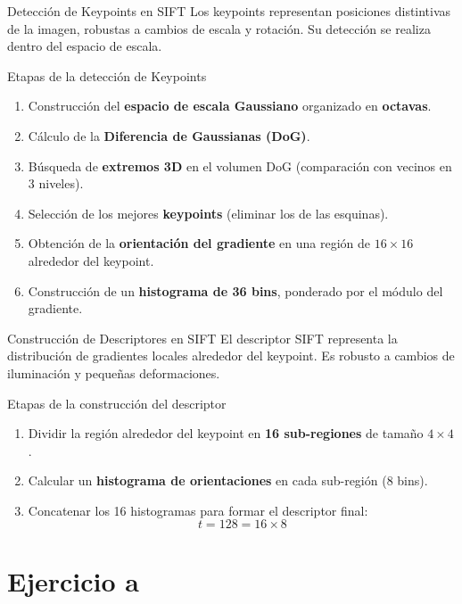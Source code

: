 \documentclass{beamer}
\begin{document}
\begin{frame}[fragile]{Detección de Keypoints en SIFT}
	\justifying
	Los keypoints representan posiciones distintivas de la imagen, robustas a cambios de escala y rotación. Su detección se realiza dentro del espacio de escala.
	
	\begin{block}{Etapas de la detección de Keypoints}
		\begin{enumerate}
			\item Construcción del \textbf{espacio de escala Gaussiano} organizado en \textbf{octavas}.
			\item Cálculo de la \textbf{Diferencia de Gaussianas (DoG)}.
			\item Búsqueda de \textbf{extremos 3D} en el volumen DoG (comparación con vecinos en 3 niveles).
			\item Selección de los mejores \textbf{keypoints} (eliminar los de las esquinas).
			\item Obtención de la \textbf{orientación del gradiente} en una región de \(16 \times 16\) alrededor del keypoint.
			\item Construcción de un \textbf{histograma de 36 bins}, ponderado por el módulo del gradiente.
		\end{enumerate}
	\end{block}
\end{frame}

\begin{frame}[fragile]{Construcción de Descriptores en SIFT}
	\justifying
	El descriptor SIFT representa la distribución de gradientes locales alrededor del keypoint. Es robusto a cambios de iluminación y pequeñas deformaciones.
	
	\begin{block}{Etapas de la construcción del descriptor}
		\begin{enumerate}
			\item Dividir la región alrededor del keypoint en \textbf{16 sub-regiones} de tamaño \(4 \times 4\).
			\item Calcular un \textbf{histograma de orientaciones} en cada sub-región (8 bins).
			\item Concatenar los 16 histogramas para formar el descriptor final:
			\[
			t = 128 = 16 \times 8
			\]
		\end{enumerate}
	\end{block}
\end{frame}

\section{Ejercicio a}
\end{document}
